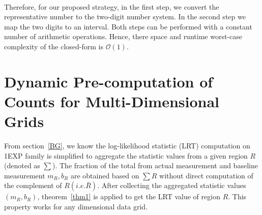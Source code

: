 \documentclass[AMA,LATO1COL]{WileyNJD-v2}
\newcommand\bigo{\mathcal O}
\begin{document}
\begin{table}[!ht]
  \centering
  \\
  \caption{Example: Interval Transformation for even/odd number of points }\label{maptable}
\end{table}


Therefore, for our proposed strategy, in the first step, we convert the representative number to the
two-digit number system.  In the second step we map the two digits to
an interval. Both steps can be performed with a constant number of
arithmetic operations. Hence, there space and runtime worst-case
complexity of the closed-form is $\bigo(1)$.


\section{Dynamic Pre-computation of Counts for Multi-Dimensional Grids}
\label{sec:dy}
From section~\ref{BG}, we know the log-likelihood statistic (LRT)
computation on 1EXP family is simplified to aggregate the statistic
values from a given region $R$ (denoted as $\sum $). The fraction of
the total from actual measurement and baseline measurement $m_R,b_R$
are obtained based on $\sum R$ without direct computation of the
complement of $R (i.e. \bar R)$. After collecting the aggregated
statistic values $(m_R,b_R)$, theorem~\ref{thm1} is applied to get the
LRT value of region $R$. This property works for any dimensional data grid. 
\end{document}
